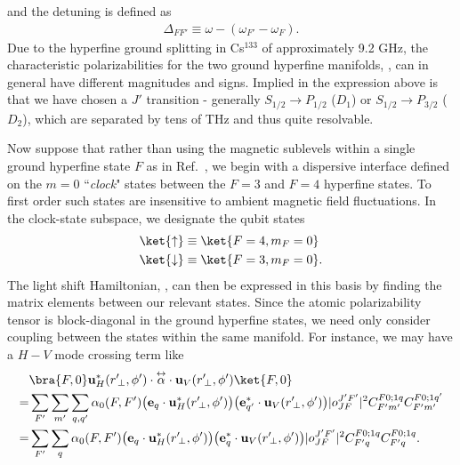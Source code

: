and the detuning is defined as
\begin{align}
	\Delta_{FF'} \equiv \omega - (\omega_{F'} - \omega_{F}).
\end{align}
Due to the hyperfine ground splitting in Cs$^{133}$ of approximately 9.2 GHz, the characteristic 
polarizabilities for the two ground hyperfine manifolds, , can in 
general have different magnitudes and signs.  Implied in the expression above is that we have chosen a 
$J'$ transition - generally $S_{1/2} \rightarrow P_{1/2}$ ($D_1$) or $S_{1/2} \rightarrow P_{3/2}$ ($D_2$), 
which are 
separated by tens of THz and thus quite resolvable.   

Now suppose that rather than using the magnetic sublevels within a single ground hyperfine state $F$ as 
in Ref.~\cite{Deutsch2010a}, we begin with a dispersive interface defined on the $m=0$ ``\textit{clock}" states 
between the $F=3$ and $F=4$ hyperfine states.  To first order such states are insensitive to ambient 
magnetic field fluctuations.  In the clock-state subspace, we designate the qubit states
\begin{align} 
	\ket{\uparrow} &\equiv \ket{F = 4,m_F = 0} \\
 	\ket{\downarrow} &\equiv \ket{F = 3,m_F=0}.
\end{align}
The light shift Hamiltonian, , can then be expressed in this basis by finding 
the 
matrix elements between our relevant states.  Since the atomic polarizability tensor is block-diagonal in 
the ground hyperfine states, we need only consider coupling between the states within the same 
manifold.  
For instance, we may have a $H-V$ mode crossing term like
\begin{align} \label{eq:ClockMatrixElement}
	&\bra{F,0} \mathbf{u}^*_H(r^\prime\!_\perp, \phi') \cdot \tensor{\alpha} \cdot 
	\mathbf{u}_{V}(r^\prime\!_\perp, \phi') \ket{F,0}\nonumber\\
  =& 
	\sum_{F'} \sum_{m'} \sum_{q, q'} \alpha_0(F,F') \big( \mathbf{e}_q \cdot 
	\mathbf{u}^*_H(r^\prime\!_\perp, \phi') \big) 
	\big( \mathbf{e}^*_{q'} \cdot \mathbf{u}_V(r^\prime\!_\perp, \phi') \big) |o^{J'F'}_{JF} |^2 C^{F 0;1 
	q}_{F' m'} C^{F 
	0;1q'}_{F' m'} \\
 = & \sum_{F'} \sum_{q} \alpha_0(F,F') \big( \mathbf{e}_q \cdot \mathbf{u}^*_H(r^\prime\!_\perp, \phi') 
	\big) \big( 
	\mathbf{e}^*_{q} \cdot \mathbf{u}_V(r^\prime\!_\perp, \phi') \big) |o^{J'F'}_{JF} |^2 C^{F 0;1q}_{F' q} 
	C^{F 0;1q}_{F' q}.
\end{align}
